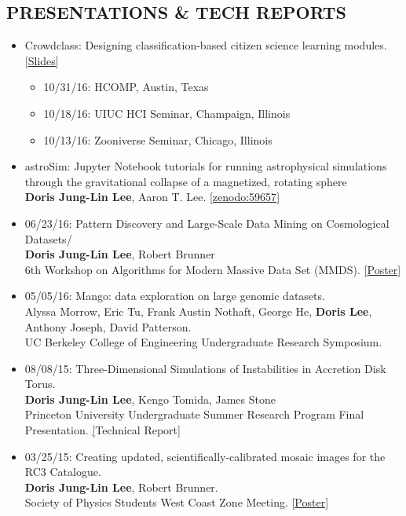 \documentclass{res}
\begin{document}
\begin{resume}
\section{PRESENTATIONS \& TECH REPORTS}
\begin{itemize}
\item Crowdclass: Designing classification-based citizen science learning modules. [\href{http://dorisjunglinlee.com/files/crowdclass_slides.pdf}{Slides}]
	\begin{itemize}[label={$\circ$}]\itemsep -3pt
	\item 10/31/16: HCOMP, Austin, Texas
	\item 10/18/16: UIUC HCI Seminar, Champaign, Illinois
	\item 10/13/16: Zooniverse Seminar, Chicago, Illinois
	\end{itemize}
\item astroSim: Jupyter Notebook tutorials for running astrophysical simulations through the gravitational collapse of a magnetized, rotating sphere
\vspace{-5pt}
\\ {\footnotesize\textbf{Doris Jung-Lin Lee}, Aaron T. Lee. [\href{http://doi.org/10.5281/zenodo.59657}{zenodo:59657}]}
\item 06/23/16: Pattern Discovery and Large-Scale Data Mining on Cosmological Datasets/
\\ {\footnotesize \textbf{Doris Jung-Lin Lee}, Robert Brunner
\vspace{-5pt} 
\\ 6th Workshop on Algorithms for Modern Massive Data Set (MMDS).  [\href{http://dorisjunglinlee.com/files/MMDS_poster.pdf}{Poster}]}
\item 05/05/16: Mango: data exploration on large genomic datasets. 
\\ {\footnotesize Alyssa Morrow, Eric Tu, Frank Austin Nothaft, George He, \textbf{Doris Lee}, Anthony Joseph, David Patterson. 
\vspace{-5pt}
\\ UC Berkeley College of Engineering Undergraduate Research Symposium.}
\item 08/08/15:  Three-Dimensional Simulations of Instabilities in Accretion Disk Torus. 
\\ {\footnotesize  \textbf{Doris Jung-Lin Lee}, Kengo Tomida, James Stone
\vspace{-5pt}
\\ Princeton University Undergraduate Summer Research Program Final Presentation. \href{http://dorisjunglinlee.com/files/PrincetonUSRPreport.pdf}[{Technical Report}]}
\item 03/25/15: Creating updated, scientifically-calibrated mosaic images for the RC3 Catalogue.
\\ {\footnotesize \textbf{Doris Jung-Lin Lee}, Robert Brunner.
\vspace{-5pt}
\\ Society of Physics Students West Coast Zone Meeting. [\href{http://dorisjunglinlee.com/files/rc3_poster_sps_zone_meeting.pdf}{Poster}]}



\end{itemize}
\end{resume}
\end{document}

